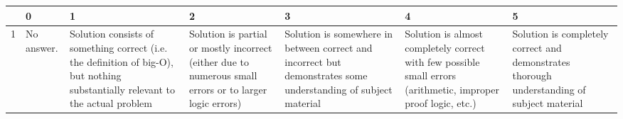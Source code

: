 \tiny
\begin{tabularx}{\linewidth}{XXXXXXX}
   & 0          & 1                                                                                                                               & 2                                                                                                                                                                               & 3                                                                                                                                                                                                                                                                                                                                                                                                                                                                                                                  & 4                                                                                                                                       & 5                                                                                          \\ \hline
1  & No answer. & Solution consists of something correct (i.e. the definition of big-O), but nothing substantially relevant to the actual problem & Solution is partial or mostly incorrect (either due to numerous small errors or to larger logic errors)                                                                         & Solution is somewhere in between correct and incorrect but demonstrates some understanding of subject material                                                                                                                                                                                                                                                                                                                                                                                                     & Solution is almost completely correct with few possible small errors (arithmetic, improper proof logic, etc.)                           & Solution is completely correct and demonstrates thorough understanding of subject material \\ \hline

\end{tabularx}
